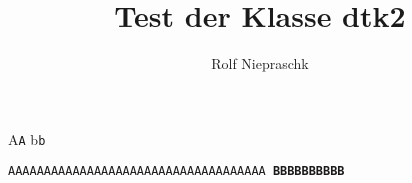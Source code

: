 \documentclass{dtk2}
\author{Rolf Niepraschk}
\begin{document}
\title{Test der Klasse dtk2}

\maketitle

A\texttt{A} b\texttt{b}

\texttt{AAAAAAAAAAAAAAAAAAAAAAAAAAAAAAAAAAAA \bfseries BBBBBBBBBB}

\blinddocument

%
\end{document}
